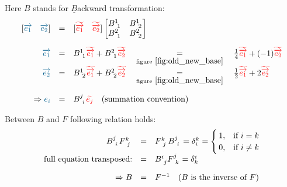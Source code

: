 Here $B$ stands for $\underline{B}$ackward transformation:
\begin{equation}
    \label{eq:backward_trafo}
    \begin{array}{rcl}
        [\hdbv{1} \quad \hdbv{2}] & = &
        [\hdbtv{1} \quad \hdbtv{2}]
        \begin{bmatrix}
            B^{1~}_{~1} & B^{1~}_{~2} \\
            B^{2~}_{~1} & B^{2~}_{~2}
        \end{bmatrix} \\
        \noalign{\vskip10pt}
        \hdbv{1} & = & B^{1~}_{~1}\hdbtv{1} + B^{2~}_{~1}\hdbtv{2}
        \quad \underset{\text{figure}~\ref{fig:old_new_base}}{=} \quad
        \frac{1}{4} \hdbtv{1} + (-1) \hdbtv{2}\\
        \hdbv{2} & = & B^{1~}_{~2}\hdbtv{1} + B^{2~}_{~2}\hdbtv{2}
        \quad \underset{\text{figure}~\ref{fig:old_new_base}}{=} \quad
        \frac{1}{2}\hdbtv{1} + 2 \hdbtv{2} \\
        \noalign{\vskip10pt}
        \Rightarrow \hdbvc{i} & = &
        B^{j~}_{~i}\hdbtvc{j}\quad\text{(summation convention)}
    \end{array}
\end{equation}

Between $B$ and $F$ following relation holds:
\begin{equation}
    \label{eq:forward_backward_inverse}
    \begin{array}{rcl}
        B^{j~}_{~i} F^{k~}_{~j} & = & F^{k~}_{~j} B^{j~}_{~i}
        = \delta^k_i =
        \begin{cases}
            1, & \text{if}\ i = k \\
            0, & \text{if}\ i \neq k
        \end{cases} \\
        \text{full equation transposed:} & = &
        B^{i~}_{~j} F^{j~}_{~k} = \delta^i_k \\
        \noalign{\vskip10pt}
        \Rightarrow B & = & F^{-1} \quad\text{($B$ is the inverse of $F$)}
    \end{array}
\end{equation}


\newpage

